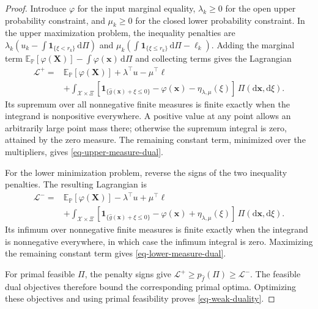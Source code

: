 \begin{proof}
  Introduce $\varphi$ for the input marginal equality, $\lambda_k\ge0$ for the open upper probability constraint, and $\mu_k\ge0$ for the closed lower probability constraint. In the upper maximization problem, the inequality penalties are
  $\lambda_k(u_k-\int\mathbf1_{\{\xi<r_k\}}\,\mathrm d\Pi)$ and
  $\mu_k(\int\mathbf1_{\{\xi\le r_k\}}\,\mathrm d\Pi-\ell_k)$.
  Adding the marginal term $\mathbb E_{\mathbb P}[\varphi(\bm X)]-\int\varphi(\bm x)\,\mathrm d\Pi$ and collecting terms gives the Lagrangian \citep[Section~5.1]{B.V04}
  \begin{equation}
    \begin{aligned}
      \mathcal L^+={}&\mathbb E_{\mathbb P}\left[\varphi(\bm X)\right]+\lambda^\top u-\mu^\top\ell\\
      &+\int_{\mathcal X\times\Xi}\left[\mathbf1_{\{\hat g(\bm x)+\xi\le0\}}-\varphi(\bm x)-\eta_{\lambda,\mu}(\xi)\right]\,\Pi\left(\mathrm d\bm x,\mathrm d\xi\right).
    \end{aligned}
    \label{eq-upper-lagrangian}
  \end{equation}
  Its supremum over all nonnegative finite measures is finite exactly when the integrand is nonpositive everywhere. A positive value at any point allows an arbitrarily large point mass there; otherwise the supremum integral is zero, attained by the zero measure. The remaining constant term, minimized over the multipliers, gives \eqref{eq-upper-measure-dual}.

  For the lower minimization problem, reverse the signs of the two inequality penalties. The resulting Lagrangian is
  \begin{equation}
    \begin{aligned}
      \mathcal L^-={}&\mathbb E_{\mathbb P}\left[\varphi(\bm X)\right]-\lambda^\top u+\mu^\top\ell\\
      &+\int_{\mathcal X\times\Xi}\left[\mathbf1_{\{\hat g(\bm x)+\xi\le0\}}-\varphi(\bm x)+\eta_{\lambda,\mu}(\xi)\right]\,\Pi\left(\mathrm d\bm x,\mathrm d\xi\right).
    \end{aligned}
    \label{eq-lower-lagrangian}
  \end{equation}
  Its infimum over nonnegative finite measures is finite exactly when the integrand is nonnegative everywhere, in which case the infimum integral is zero. Maximizing the remaining constant term gives \eqref{eq-lower-measure-dual}.

  For primal feasible $\Pi$, the penalty signs give $\mathcal L^+\ge p_{\hat f}(\Pi)\ge\mathcal L^-$. The feasible dual objectives therefore bound the corresponding primal optima. Optimizing these objectives and using primal feasibility proves \eqref{eq-weak-duality}.
\end{proof}

